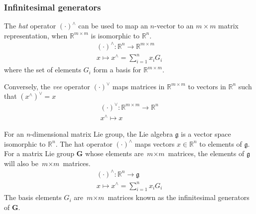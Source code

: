		\subsubsection{Infinitesimal generators}
			The \textit{hat} operator $(\cdot)^{\wedge}$ can be used to map an $n$-vector to an $m \times m$ matrix representation, when $\mathbb{R}^{m \times m}$ is isomorphic to $\mathbb{R}^n$.
			\begin{equation}
				\begin{split}
					(\cdot)^{\wedge}: \mathbb{R}^n \rightarrow \mathbb{R}^{m \times m}\\
					x \mapsto x^{\wedge} = \sum\limits_{i=1}^n x_iG_i
				\end{split}
			\end{equation}
			where the set of elements $G_i$ form a basis for $\mathbb{R}^{m \times m}$.
			
			Conversely, the \textit{vee} operator $(\cdot)^{\vee}$ maps matrices in $\mathbb{R}^{m \times m}$ to vectors in $\mathbb{R}^n$ such that ${(x^{\wedge})}^{\vee} = x$
			\begin{equation}
				\begin{split}
					(\cdot)^{\vee}: \mathbb{R}^{m \times m} \rightarrow \mathbb{R}^n\\
					x^{\wedge} \mapsto x
				\end{split}
			\end{equation}
		
			For an \textit{n}-dimensional matrix Lie group, the Lie algebra $\mathfrak{g}$ is a vector space isomorphic to $\mathbb{R}^n$. The hat operator $(\cdot)^{\wedge}$ maps vectors $x \in \mathbb{R}^n$ to elements of $\mathfrak{g}$.	For a matrix Lie group $\mathbf{G}$ whose elements are $\textit{m} \times \textit{m}$ matrices, the elements of $\mathfrak{g}$ will also be $\textit{m} \times \textit{m}$ matrices.		
			\begin{equation}
				\begin{split}
					(\cdot)^{\wedge}:\mathbb{R}^n \rightarrow \mathfrak{g}\\
					x \mapsto x^{\wedge} = \sum\limits_{i=1}^n x_iG_i 
				\end{split}
			\end{equation}
			The basis elements $G_i$ are $\textit{m} \times \textit{m}$ matrices known as the infinitesimal generators of $\mathbf{G}$.
									
